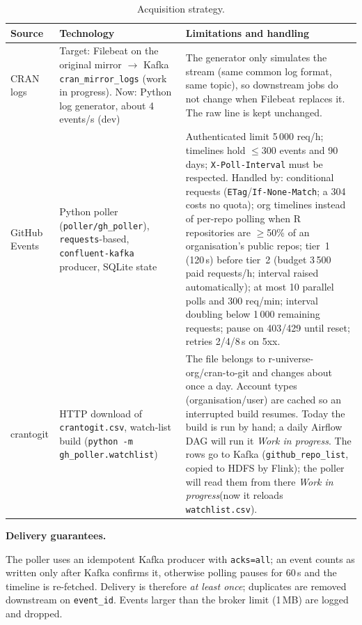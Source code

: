 \documentclass[11pt,a4paper]{article}
\newcommand{\hd}[1]{\par\Needspace{7\baselineskip}\medskip\noindent\textbf{#1}\par\nopagebreak\smallskip}
\newcommand{\planned}{\textit{Work in progress}}
\begin{document}
\begin{table}[H]
\centering
\caption{Acquisition strategy.}
\small
\begin{tabularx}{\textwidth}{@{}L{2.6cm}L{4.2cm}Y@{}}
\toprule
\textbf{Source} & \textbf{Technology} & \textbf{Limitations and handling} \\
\midrule
CRAN logs &
  Target: Filebeat on the original mirror $\to$ Kafka \texttt{cran\_\allowbreak{}mirror\_\allowbreak{}logs} (work in progress). Now: Python log generator, about 4 events/s (dev) &
  The generator only simulates the stream (same common log format, same topic), so downstream jobs do not change when Filebeat replaces it. The raw line is kept unchanged. \\
GitHub Events &
  Python poller (\texttt{poller/gh\_\allowbreak{}poller}), \texttt{requests}-based, \texttt{confluent-kafka} producer, SQLite state &
  Authenticated limit 5\,000 req/h; timelines hold $\le$300 events and 90 days; \texttt{X-Poll-Interval} must be respected.
  Handled by: conditional requests (\texttt{ETag}/\texttt{If-None-Match}; a 304 costs no quota); org timelines instead
  of per-repo polling when R repositories are $\ge$50\% of an organisation's public repos; tier~1 (120\,s) before tier~2
  (budget 3\,500 paid requests/h; interval raised automatically); at most 10 parallel polls and 300 req/min;
  interval doubling below 1\,000 remaining requests; pause on 403/429 until reset; retries 2/4/8\,s on 5xx. \\
crantogit &
  HTTP download of \texttt{crantogit.csv}, watch-list build (\texttt{python -m gh\_\allowbreak{}poller.watchlist}) &
  The file belongs to r-universe-org/cran-to-git and changes about once a day. Account types (organisation/user) are cached so an interrupted build resumes. Today the build is run by hand; a daily Airflow DAG will run it \planned. The rows go to Kafka (\texttt{github\_\allowbreak{}repo\_\allowbreak{}list}, copied to HDFS by Flink); the poller will read them from there \planned (now it reloads \texttt{watchlist.csv}). \\
\bottomrule
\end{tabularx}
\end{table}

\hd{Delivery guarantees.} The poller uses an idempotent Kafka producer with \texttt{acks=all}; an event counts as written
only after Kafka confirms it, otherwise polling pauses for 60\,s and the timeline is re-fetched. Delivery is therefore
\emph{at least once}; duplicates are removed downstream on \texttt{event\_\allowbreak{}id}. Events larger than the broker limit (1\,MB)
are logged and dropped.
\end{document}
